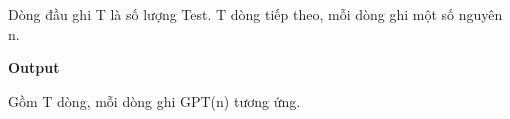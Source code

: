 Dòng đầu ghi T là số lượng Test. T dòng tiếp theo, mỗi dòng ghi một số nguyên n.  

\textbf{    Output   }

   Gồm T dòng, mỗi dòng ghi GPT(n) tương ứng.  

\